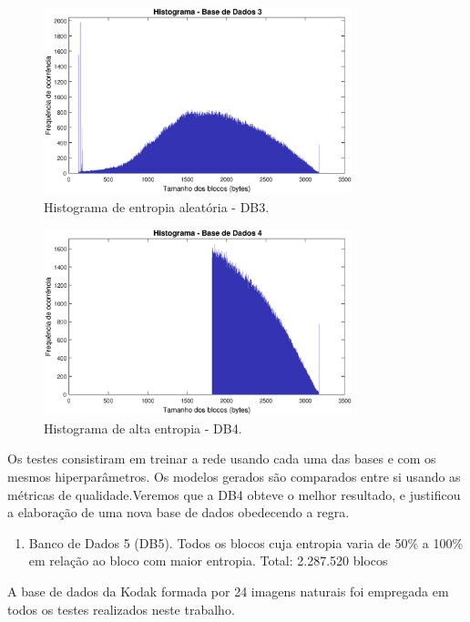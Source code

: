 \begin{figure}
\centering
\includegraphics[width=0.80\textwidth]{figuras/hist3.eps}
\caption[Histograma da entropia aleatória - DB3]{Histograma de entropia aleatória - DB3.}
\label{fig:database3}
\end{figure}

\begin{figure}
\centering
\includegraphics[width=0.8\textwidth]{figuras/hist4.eps}
\caption[Histograma de alta entropia - DB4]{Histograma de alta entropia - DB4.}
\label{fig:database4}
\end{figure}

Os testes consistiram em treinar a rede usando cada uma das bases e com os mesmos hiperparâmetros. Os modelos gerados são comparados entre si usando as métricas de qualidade.Veremos que a DB4 obteve o melhor resultado, e justificou a elaboração de uma nova base de dados obedecendo a regra.

\begin {enumerate}
\item Banco de Dados 5 (DB5). Todos os blocos cuja entropia varia de 50\% a 100\% em relação ao bloco com maior entropia. Total: 2.287.520 blocos
\end{enumerate}

A base de dados da Kodak \cite{kodak} formada por 24 imagens naturais foi empregada em todos os testes realizados neste trabalho.  

